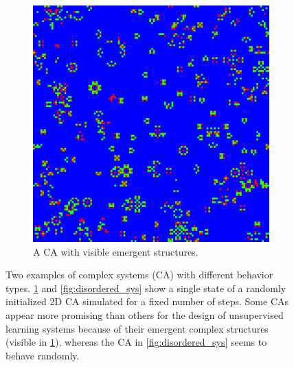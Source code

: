 \begin{enumerate}
\begin{figure}[htbp]
\begin{subfigure}[t]{.4\linewidth}
  \includegraphics[width=\linewidth]{figures/micro4.png}
  \caption{A \acl{CA} with visible emergent structures.}
  \label{fig:structured_sys}
\end{subfigure}
\caption{Two examples of complex systems (\acf{CA}) with different behavior
  types. \ref{fig:structured_sys} and \ref{fig:disordered_sys} show a single state 
  of a randomly initialized 2D \ac{CA} simulated for a fixed number of steps. Some \acp{CA} 
  appear more promising than others for the design of
  unsupervised learning systems because of their emergent complex structures
  (visible in \ref{fig:structured_sys}), whereas the \ac{CA} in
  \ref{fig:disordered_sys} seems to behave randomly.}
  \label{fig:comparison_ca}
\end{figure}


\end{enumerate}
